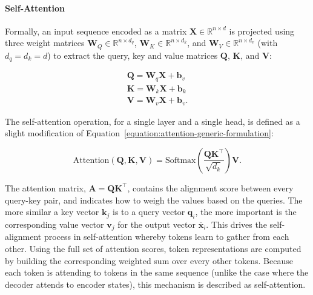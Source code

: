 \paragraph{Self-Attention} Formally, an input sequence encoded as a matrix $\bm{X} \in \mathbb{R}^{n \times d}$ is projected using three weight matrices $\bm{W}_Q \in \mathbb{R}^{n \times d_q}$, $\bm{W}_K \in \mathbb{R}^{n \times d_k}$, and $\bm{W}_V \in \mathbb{R}^{n \times d_v}$ (with $d_q = d_k = d$) to extract the query, key and value matrices $\bm{Q}$, $\bm{K}$, and $\bm{V}$:

\begin{equation}
\begin{aligned}
    \bm{Q} = \bm{W}_q \bm{X} + \bm{b}_v \\
    \bm{K} = \bm{W}_k \bm{X} + \bm{b}_k \\
    \bm{V} = \bm{W}_v \bm{X} + \bm{b}_v.
\end{aligned}    
\end{equation}
 

The self-attention operation, for a single layer and a single head, is defined as a slight modification of Equation~\ref{equation:attention-generic-formulation}:

\begin{equation}
    \text{Attention}(\bm{Q}, \bm{K}, \bm{V}) = \text{Softmax}\left(\dfrac{\bm{Q}\bm{K}^\top}{\sqrt{d_k}}\right)\bm{V}.
\end{equation}

The attention matrix, $\bm{A} = \bm{Q}\bm{K}^\top$, contains the alignment score between every query-key pair, and indicates how to weigh the values based on the queries. The more similar a key vector $\bm{k}_j$ is to a query vector $\bm{q}_i$, the more important is the corresponding value vector $\bm{v}_j$ for the output vector $\overline{\bm{x}}_i$. This drives the self-alignment process in self-attention whereby tokens learn to gather from each other. Using the full set of attention scores, token representations are computed by building the corresponding weighted sum over every other tokens. Because each token is attending to tokens in the same sequence (unlike the case where the decoder attends to encoder states), this mechanism is described as self-attention.

